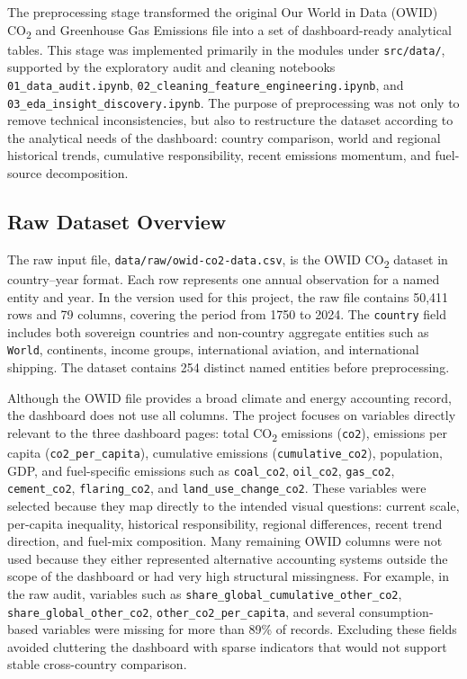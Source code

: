 \documentclass[a4paper,12pt]{article}
\begin{document}
The preprocessing stage transformed the original Our World in Data (OWID) CO\textsubscript{2}
and Greenhouse Gas Emissions file into a set of dashboard-ready analytical tables. This
stage was implemented primarily in the modules under \texttt{src/data/}, supported by the
exploratory audit and cleaning notebooks \texttt{01\_data\_audit.ipynb},
\texttt{02\_cleaning\_feature\_engineering.ipynb}, and
\texttt{03\_eda\_insight\_discovery.ipynb}. The purpose of preprocessing was not only to
remove technical inconsistencies, but also to restructure the dataset according to the
analytical needs of the dashboard: country comparison, world and regional historical
trends, cumulative responsibility, recent emissions momentum, and fuel-source
decomposition.

\subsection{Raw Dataset Overview}

The raw input file, \texttt{data/raw/owid-co2-data.csv}, is the OWID CO\textsubscript{2}
dataset in country--year format. Each row represents one annual observation for a named
entity and year. In the version used for this project, the raw file contains 50,411 rows
and 79 columns, covering the period from 1750 to 2024. The \texttt{country} field includes
both sovereign countries and non-country aggregate entities such as \texttt{World},
continents, income groups, international aviation, and international shipping. The
dataset contains 254 distinct named entities before preprocessing.

Although the OWID file provides a broad climate and energy accounting record, the dashboard
does not use all columns. The project focuses on variables directly relevant to the three
dashboard pages: total CO\textsubscript{2} emissions (\texttt{co2}), emissions per capita
(\texttt{co2\_per\_capita}), cumulative emissions (\texttt{cumulative\_co2}), population,
GDP, and fuel-specific emissions such as \texttt{coal\_co2}, \texttt{oil\_co2},
\texttt{gas\_co2}, \texttt{cement\_co2}, \texttt{flaring\_co2}, and
\texttt{land\_use\_change\_co2}. These variables were selected because they map directly
to the intended visual questions: current scale, per-capita inequality, historical
responsibility, regional differences, recent trend direction, and fuel-mix composition.
Many remaining OWID columns were not used because they either represented alternative
accounting systems outside the scope of the dashboard or had very high structural
missingness. For example, in the raw audit, variables such as
\texttt{share\_global\_cumulative\_other\_co2}, \texttt{share\_global\_other\_co2},
\texttt{other\_co2\_per\_capita}, and several consumption-based variables were missing
for more than 89\% of records. Excluding these fields avoided cluttering the dashboard
with sparse indicators that would not support stable cross-country comparison.
\end{document}
